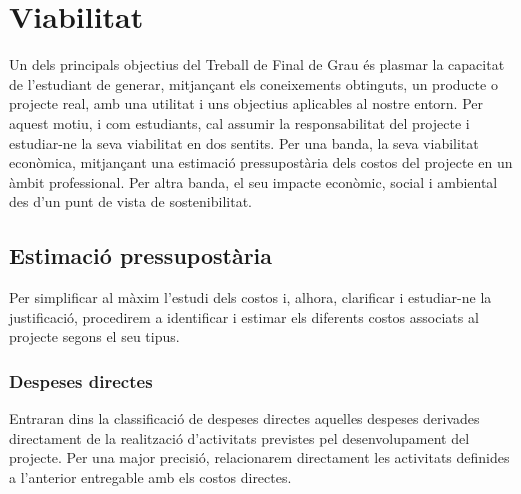 \section{Viabilitat}

Un dels principals objectius del Treball de Final de Grau és plasmar la capacitat de l'estudiant de generar, mitjançant els coneixements obtinguts, un producte o projecte real, amb una utilitat i uns objectius aplicables al nostre entorn. Per aquest motiu, i com estudiants, cal assumir la responsabilitat del projecte i estudiar-ne la seva viabilitat en dos sentits. Per una banda, la seva viabilitat econòmica, mitjançant una estimació pressupostària dels costos del projecte en un àmbit professional. Per altra banda, el seu impacte econòmic, social i ambiental des d'un punt de vista de sostenibilitat.


\subsection{Estimació pressupostària}

Per simplificar al màxim l’estudi dels costos i, alhora, clarificar i estudiar-ne la justificació, procedirem a identificar i estimar els diferents costos associats al projecte segons el seu tipus.

\subsubsection{Despeses directes}

Entraran dins la classificació de despeses directes aquelles despeses derivades directament de la realització d’activitats previstes pel desenvolupament del projecte. Per una major precisió, relacionarem directament les activitats definides a l’anterior entregable amb els costos directes.  \\


